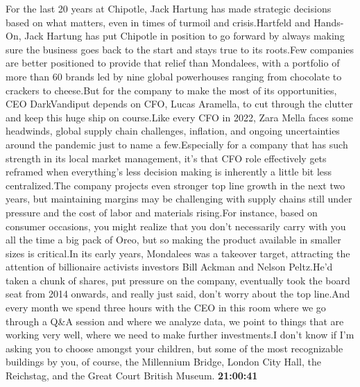 \documentclass{article}%
\begin{document}
For the last 20 years at Chipotle, Jack Hartung has made strategic decisions based on what matters, even in times of turmoil and crisis.Hartfeld and Hands{-}On, Jack Hartung has put Chipotle in position to go forward by always making sure the business goes back to the start and stays true to its roots.Few companies are better positioned to provide that relief than Mondalees, with a portfolio of more than 60 brands led by nine global powerhouses ranging from chocolate to crackers to cheese.But for the company to make the most of its opportunities, CEO DarkVandiput depends on CFO, Lucas Aramella, to cut through the clutter and keep this huge ship on course.Like every CFO in 2022, Zara Mella faces some headwinds, global supply chain challenges, inflation, and ongoing uncertainties around the pandemic just to name a few.Especially for a company that has such strength in its local market management, it's that CFO role effectively gets reframed when everything's less decision making is inherently a little bit less centralized.The company projects even stronger top line growth in the next two years, but maintaining margins may be challenging with supply chains still under pressure and the cost of labor and materials rising.For instance, based on consumer occasions, you might realize that you don't necessarily carry with you all the time a big pack of Oreo, but so making the product available in smaller sizes is critical.In its early years, Mondalees was a takeover target, attracting the attention of billionaire activists investors Bill Ackman and Nelson Peltz.He'd taken a chunk of shares, put pressure on the company, eventually took the board seat from 2014 onwards, and really just said, don't worry about the top line.And every month we spend three hours with the CEO in this room where we go through a Q\&A session and where we analyze data, we point to things that are working very well, where we need to make further investments.I don't know if I'm asking you to choose amongst your children, but some of the most recognizable buildings by you, of course, the Millennium Bridge, London City Hall, the Reichstag, and the Great Court British Museum.%
\textbf{21:00:41}%
\end{document}
